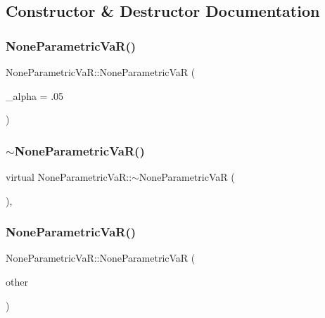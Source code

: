 \subsection{Constructor \& Destructor Documentation}
\hypertarget{classNoneParametricVaR_a0d9d38576c718b01b2ce865e2edaf84e}{}\label{classNoneParametricVaR_a0d9d38576c718b01b2ce865e2edaf84e} 
\subsubsection{\texorpdfstring{None\+Parametric\+Va\+R()}{NoneParametricVaR()}\hspace{0.1cm}{\footnotesize\ttfamily [1/2]}}
{\footnotesize\ttfamily None\+Parametric\+Va\+R\+::\+None\+Parametric\+VaR (\begin{DoxyParamCaption}\item[{double}]{\+\_\+alpha = {\ttfamily .05} }\end{DoxyParamCaption})}

\hypertarget{classNoneParametricVaR_aac413dea6f621cbe6e1f5037665296c0}{}\label{classNoneParametricVaR_aac413dea6f621cbe6e1f5037665296c0} 
\subsubsection{\texorpdfstring{$\sim$\+None\+Parametric\+Va\+R()}{~NoneParametricVaR()}}
{\footnotesize\ttfamily virtual None\+Parametric\+Va\+R\+::$\sim$\+None\+Parametric\+VaR (\begin{DoxyParamCaption}{ }\end{DoxyParamCaption})\hspace{0.3cm}{\ttfamily [inline]}, {\ttfamily [virtual]}}

\hypertarget{classNoneParametricVaR_a6aa2553d8ce6b76aed6cb9adf35ca508}{}\label{classNoneParametricVaR_a6aa2553d8ce6b76aed6cb9adf35ca508} 
\subsubsection{\texorpdfstring{None\+Parametric\+Va\+R()}{NoneParametricVaR()}\hspace{0.1cm}{\footnotesize\ttfamily [2/2]}}
{\footnotesize\ttfamily None\+Parametric\+Va\+R\+::\+None\+Parametric\+VaR (\begin{DoxyParamCaption}\item[{const \hyperlink{classNoneParametricVaR}{None\+Parametric\+VaR} \&}]{other }\end{DoxyParamCaption})}



